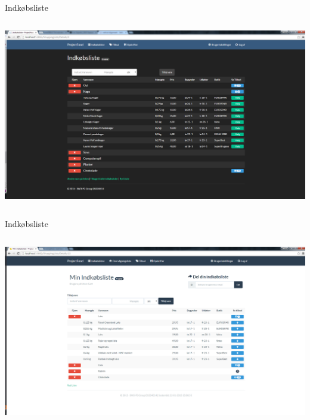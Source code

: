 \begin{frame}{Indkøbsliste}

	
	\begin{minipage}[0.3\textheight]{\textwidth}
	\begin{columns}[T]
	\begin{column}{1\textwidth}
	 \includegraphics[width=1\textwidth,height=1\textheight,keepaspectratio, trim={1cm 0 0 16mm}, clip]{images/Screenshots/ShoppingListOffersOld.png}
	
	\end{column}

	\end{columns}

  \end{minipage}
	
\end{frame}

\begin{frame}{Indkøbsliste}

	
	\begin{minipage}[0.3\textheight]{\textwidth}
	\begin{columns}[T]
	\begin{column}{1\textwidth}
	 \includegraphics[width=1\textwidth,height=1\textheight,keepaspectratio, trim={1cm 0 0 16mm}, clip]{images/Screenshots/ShoppingList.png}
	
	\end{column}

	\end{columns}

  \end{minipage}
	
\end{frame}

